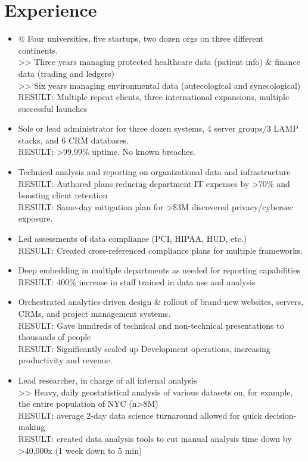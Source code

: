 \documentclass[]{deedy-resume-openfont}
\begin{document}
\section{Experience}
    \begin{itemize}
        \item @ Four universities, five startups, two dozen orgs on three different continents.
        \\>> Three years managing protected healthcare data (patient info) \& finance data (trading and ledgers)
        \\>> Six years managing environmental data (autecological and synecological) 
        \\RESULT: Multiple repeat clients, three international expansions, multiple successful launches
        \item Sole or lead administrator for three dozen systems, 4 server groups/3 LAMP stacks, and 6 CRM databases.
        \\ RESULT: >99.99\% uptime. No known breaches.
        \item Technical analysis and reporting on organizational data and infrastructure
        \\ RESULT: Authored plans reducing department IT expenses by >70\% and boosting client retention
        \\ RESULT: Same-day mitigation plan for >\$3M discovered privacy/cybersec exposure.
        \item Led assessments of data compliance (PCI, HIPAA, HUD, etc.)
        \\ RESULT: Created cross-referenced compliance plans for multiple frameworks.
        \item Deep embedding in multiple departments as needed for reporting capabilities
        \\ RESULT: 400\% increase in staff trained in data use and analysis
        \item Orchestrated analytics-driven design \& rollout of brand-new websites, servers, CRMs, and project management systems.
        \\ RESULT: Gave hundreds of technical and non-technical presentations to thousands of people
        \\ RESULT: Significantly scaled up Development operations, increasing productivity and revenue.
        \item Lead researcher, in charge of all internal analysis
        \\ >> Heavy, daily geostatistical analysis of various datasets on, for example, the entire population of NYC (n>8M)
        \\ RESULT: average 2-day data science turnaround allowed for quick decision-making
        \\ RESULT: created data analysis tools to cut manual analysis time down by >40,000x (1 week down to 5 min)
    \end{itemize}
\end{document}
